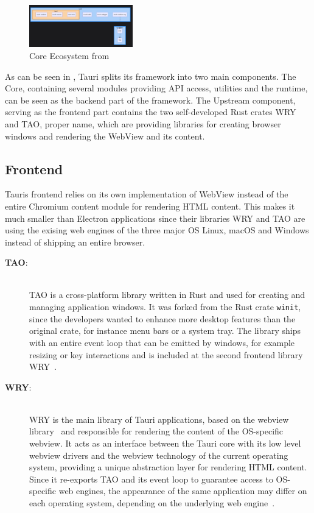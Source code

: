 \begin{figure}[ht]
    \centering
    \includegraphics[width=0.4\textwidth]{images/TauriCore}
    \caption{Core Ecosystem from~\cite{tauri}}
    \label{fig:tauri:core}
\end{figure}
As can be seen in , Tauri splits its framework into two main components.
The Core, containing several modules providing \ac{API} access, utilities and the runtime, can be seen as the backend part of the framework.
The Upstream component, serving as the frontend part contains the two self-developed Rust crates \ac{WRY} and TAO, proper name, which are providing libraries for creating browser windows and rendering the WebView and its content.

\subsection{Frontend}
\label{subsec:tauri:frontend}
Tauris frontend relies on its own implementation of WebView instead of the entire Chromium content module for rendering \ac{HTML} content.
This makes it much smaller than Electron applications since their libraries \ac{WRY} and TAO are using the exising web engines of the three major \ac{OS} Linux, macOS and Windows instead of shipping an entire browser.
\begin{description}
    \item[\textbf{TAO}:] \hfill \\
    TAO is a cross-platform library written in Rust and used for creating and managing application windows.
    It was forked from the Rust crate \texttt{winit}, since the developers wanted to enhance more desktop features than the original crate, for instance menu bars or a system tray.
    The library ships with an entire event loop that can be emitted by windows, for example resizing or key interactions and is included at the second frontend library \ac{WRY}~\cite{TAO}\@.
    \item[\textbf{\ac{WRY}}:] \hfill \\
    \ac{WRY} is the main library of Tauri applications, based on the webview library~\cite{githubWebview} and responsible for rendering the content of the \ac{OS}-specific webview.
    It acts as an interface between the Tauri core with its low level webview drivers and the webview technology of the current operating system, providing a unique abstraction layer for rendering \ac{HTML} content.
    Since it re-exports TAO and its event loop to guarantee access to \ac{OS}-specific web engines, the appearance of the same application may differ on each operating system, depending on the underlying web engine~\cite{WRY}.
\end{description}

